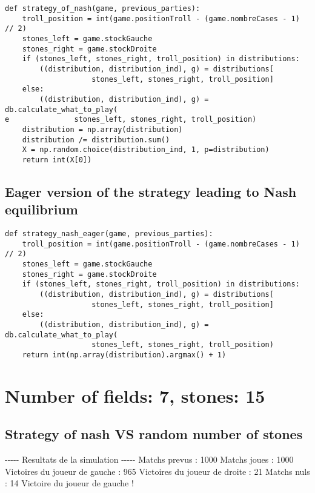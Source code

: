 \documentclass{article}%
\begin{document}
\begin{verbatim}
def strategy_of_nash(game, previous_parties):
	troll_position = int(game.positionTroll - (game.nombreCases - 1) // 2)
	stones_left = game.stockGauche
	stones_right = game.stockDroite
	if (stones_left, stones_right, troll_position) in distributions:
		((distribution, distribution_ind), g) = distributions[
					stones_left, stones_right, troll_position]
	else:
		((distribution, distribution_ind), g) = db.calculate_what_to_play(
e				stones_left, stones_right, troll_position)
	distribution = np.array(distribution)
	distribution /= distribution.sum()
	X = np.random.choice(distribution_ind, 1, p=distribution)
	return int(X[0])
\end{verbatim}

\subsection{Eager version of the strategy leading to Nash equilibrium}

\begin{verbatim}
def strategy_nash_eager(game, previous_parties):
	troll_position = int(game.positionTroll - (game.nombreCases - 1) // 2)
	stones_left = game.stockGauche
	stones_right = game.stockDroite
	if (stones_left, stones_right, troll_position) in distributions:
		((distribution, distribution_ind), g) = distributions[
					stones_left, stones_right, troll_position]
	else:
		((distribution, distribution_ind), g) = db.calculate_what_to_play(
					stones_left, stones_right, troll_position)
	return int(np.array(distribution).argmax() + 1)
\end{verbatim}

\normalsize%
\section{Number of fields: 7, stones: 15}%
\label{sec:Number of fields 7, stones 15}%
\subsection{Strategy of nash VS random number of stones}%
\label{subsec:Strategy of nash VS random number of stones}%
{-}{-}{-}{-}{-} Resultats de la simulation {-}{-}{-}{-}{-}\newline%
		\newline%
Matchs prevus : 1000\newline%
Matchs joues : 1000\newline%
\newline%
Victoires du joueur de gauche : 965\newline%
Victoires du joueur de droite : 21\newline%
Matchs nuls : 14\newline%
\newline%
Victoire du joueur de gauche !
\end{document}
